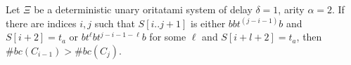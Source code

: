 


\begin{lemma}
\label{TTT_tunnelC_lemma}
Let $\Xi$ be a deterministic unary oritatami system of delay $\delta = 1$, arity $\alpha = 2$. If there are indices $i,j$ such that $S[i..j+1]$ is either $bbt^{(j-i-1)}b$ and $S[i+2] = t_a$ or $bt^\ell bt^{j-i-1-\ell}b$ for some $\ell$ and $S[i+l+2] = t_a$, then $\#bc(C_{i-1}) > \#bc(C_j)$.
\end{lemma}



